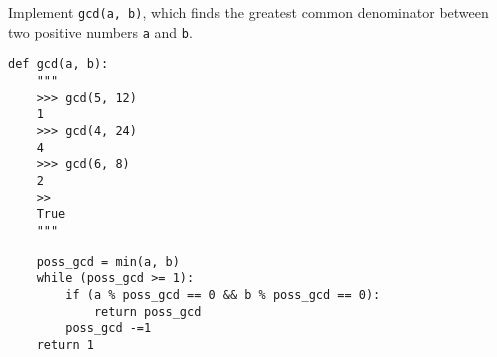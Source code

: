 \begin{blocksection}
\question Implement \lstinline$gcd(a, b)$, which finds the greatest common denominator between two positive numbers \lstinline$a$ and \lstinline$b$.

\begin{lstlisting}
def gcd(a, b):
    """
    >>> gcd(5, 12)
    1
    >>> gcd(4, 24)
    4
    >>> gcd(6, 8)
    2
    >>
    True
    """
\end{lstlisting}
\begin{solution}[2in]
\begin{lstlisting}
    poss_gcd = min(a, b)
    while (poss_gcd >= 1):
        if (a % poss_gcd == 0 && b % poss_gcd == 0):
            return poss_gcd
        poss_gcd -=1
    return 1
\end{lstlisting}
\end{solution}
\end{blocksection}

